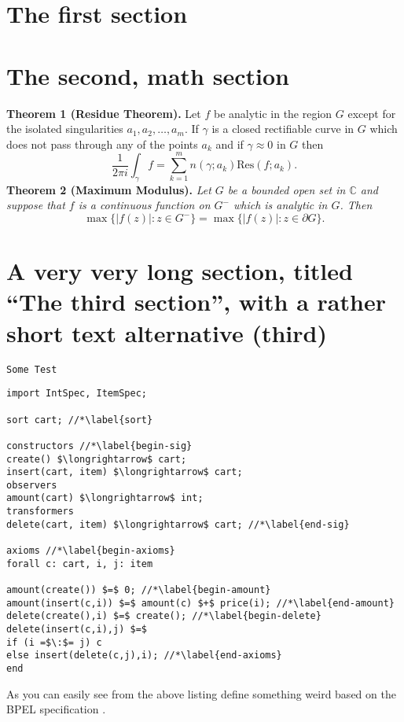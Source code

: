 \documentclass[mscthesis]{usiinfthesis}
\begin{document}
\section{The first section}

\section{The second, math section}

\textbf{Theorem 1 (Residue Theorem).}
Let $f$ be analytic in the region $G$ except for the isolated singularities $a_1,a_2,\ldots,a_m$. If $\gamma$ is a closed rectifiable curve in $G$ which does not pass through any of the points $a_k$ and if $\gamma\approx 0$ in $G$ then
\[
  \frac{1}{2\pi i}\int_\gamma f = \sum_{k=1}^m n(\gamma;a_k) \text{Res}(f;a_k).
\]
\textbf{Theorem 2 (Maximum Modulus).}
\emph{Let $G$ be a bounded open set in $\mathbb{C}$ and suppose that $f$ is a continuous function on $G^-$ which is analytic in $G$. Then}
\[
  \max\{|f(z)|:z\in G^-\}=\max \{|f(z)|:z\in \partial G \}.
\]

\section[third]{A very very long section, titled ``The third section'', with
  a rather  short text alternative (third)}

\texttt{Some Test}
\begin{lstlisting}
import IntSpec, ItemSpec;

sort cart; //*\label{sort}

constructors //*\label{begin-sig}
create() $\longrightarrow$ cart;
insert(cart, item) $\longrightarrow$ cart;
observers
amount(cart) $\longrightarrow$ int;
transformers
delete(cart, item) $\longrightarrow$ cart; //*\label{end-sig}

axioms //*\label{begin-axioms}
forall c: cart, i, j: item 

amount(create()) $=$ 0; //*\label{begin-amount}
amount(insert(c,i)) $=$ amount(c) $+$ price(i); //*\label{end-amount}
delete(create(),i) $=$ create(); //*\label{begin-delete}
delete(insert(c,i),j) $=$
if (i =$\:$= j) c
else insert(delete(c,j),i); //*\label{end-axioms}
end
\end{lstlisting}

As you can easily see from the above listing \citet{bbggs:iet07}
define something weird based on the BPEL specification
\citep{bpelspec}.
\nocite{*}
\end{document}
